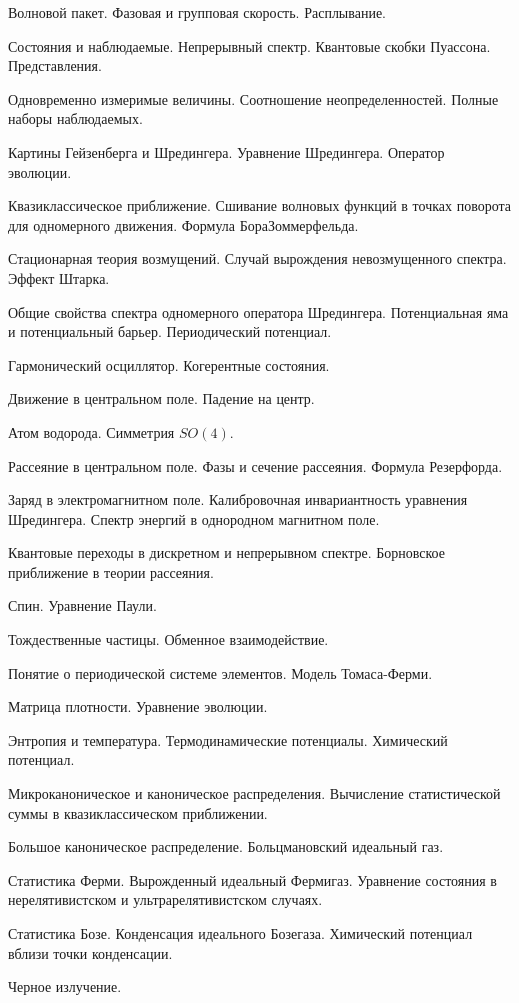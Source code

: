 \documentclass[a4paper,draft]{article}
\begin{document}
\begin{nums}{-2}
\item Волновой пакет. Фазовая и групповая скорость. Расплывание.
\item Состояния и наблюдаемые. Непрерывный спектр. Квантовые
      скобки Пуассона. Представления.
\item Одновременно измеримые
      величины. Соотношение неопределенностей. Полные наборы
      наблюдаемых.
\item Картины Гейзенберга и Шредингера. Уравнение
      Шредингера. Оператор эволюции.
\item Квазиклассическое приближение. Сшивание волновых функций в точках поворота для
      одномерного движения. Формула Бора\ч Зоммерфельда.
\item Стационарная теория возмущений. Случай вырождения невозмущенного
      спектра. Эффект Штарка.
\item Общие свойства спектра одномерного
      оператора Шредингера. Потенциальная яма и потенциальный барьер.
      Периодический потенциал.
\item Гармонический осциллятор. Когерентные состояния.
\item Движение в центральном поле. Падение на центр.
\item Атом водорода. Симметрия $SO(4)$.
\item Рассеяние в центральном поле. Фазы и сечение рассеяния. Формула Резерфорда.
\item Заряд в электромагнитном поле. Калибровочная инвариантность
      уравнения Шредингера. Спектр энергий в однородном магнитном поле.
\item Квантовые переходы в дискретном и непрерывном спектре.
      Борновское приближение в теории рассеяния.
\item Спин. Уравнение Паули.
\item Тождественные частицы. Обменное взаимодействие.
\item Понятие о периодической системе элементов. Модель Томаса-Ферми.
\item Матрица плотности. Уравнение эволюции.
\item Энтропия и температура. Термодинамические потенциалы. Химический потенциал.
\item Микроканоническое и каноническое распределения. Вычисление
      статистической суммы в квазиклассическом приближении.
\item Большое каноническое распределение. Больцмановский идеальный газ.
\item Статистика Ферми. Вырожденный идеальный Ферми\д газ.
      Уравнение состояния в нерелятивистском и
      ультрарелятивистском случаях.
\item Статистика Бозе. Конденсация идеального Бозе\д газа.
      Химический потенциал вблизи точки конденсации.
\item Черное излучение.
\end{nums}
\end{document}
